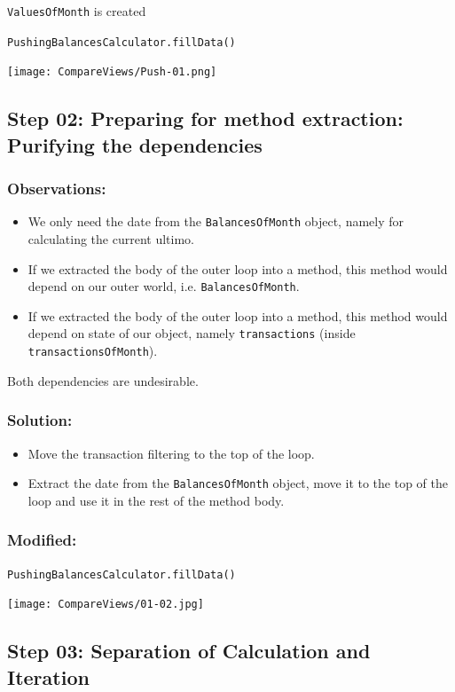 \documentclass[a4paper,fleqn,titlepage,11pt]{article}
\begin{document}
\texttt{ValuesOfMonth} is created

\texttt{PushingBalancesCalculator.fillData()}

\texttt{[image: CompareViews/Push-01.png]}


\subsection*{Step 02: Preparing for method extraction: Purifying the dependencies}

\subsubsection*{Observations:}
\begin{itemize}
\item We only need the date from the \texttt{BalancesOfMonth} object, namely for calculating the current ultimo.
\item If we extracted the body of the outer loop into a method, this method would depend on our outer world, i.e. \texttt{BalancesOfMonth}.
\item If we extracted the body of the outer loop into a method, this method would depend on state of our object, namely \texttt{transactions} (inside \texttt{transactionsOfMonth}).
\end{itemize}

Both dependencies are undesirable.

\subsubsection*{Solution:}

\begin{itemize}
\item Move the transaction filtering to the top of the loop.
\item Extract the date from the \texttt{BalancesOfMonth} object, move it to the top of the loop and use it in the rest of the method body.
\end{itemize}

\subsubsection*{Modified:}

\texttt{PushingBalancesCalculator.fillData()}

\texttt{[image: CompareViews/01-02.jpg]}


\subsection*{Step 03: Separation of Calculation and Iteration}
\end{document}
